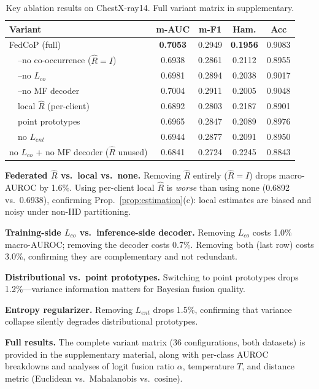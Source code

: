 \documentclass[10pt,twocolumn,letterpaper]{article}
\theoremstyle{definition}
\newcommand{\Rhat}{\widehat{R}}
\begin{document}
\begin{table}[t]
\centering
\caption{Key ablation results on ChestX-ray14. Full variant matrix in supplementary.}
\label{tab:ablation}
\footnotesize
\setlength{\tabcolsep}{3pt}
\begin{tabular}{lcccc}
\toprule
Variant & m-AUC & m-F1 & Ham. & Acc \\
\midrule
FedCoP (full)                  & \textbf{0.7053} & 0.2949 & \textbf{0.1956} & 0.9083 \\
~~--no co-occurrence ($\Rhat{=}I$) & 0.6938 & 0.2861 & 0.2112 & 0.8955 \\
~~--no $L_{co}$                 & 0.6981 & 0.2894 & 0.2038 & 0.9017 \\
~~--no MF decoder              & 0.7004 & 0.2911 & 0.2005 & 0.9048 \\
~~local $\Rhat$ (per-client)   & 0.6892 & 0.2803 & 0.2187 & 0.8901 \\
~~point prototypes             & 0.6965 & 0.2847 & 0.2089 & 0.8976 \\
~~no $L_{ent}$                 & 0.6944 & 0.2877 & 0.2091 & 0.8950 \\
\midrule
no $L_{co}$ + no MF decoder ($\Rhat$ unused) & 0.6841 & 0.2724 & 0.2245 & 0.8843 \\
\bottomrule
\end{tabular}
\end{table}

\noindent\textbf{Federated $\Rhat$ vs.\ local vs.\ none.} Removing $\Rhat$ entirely ($\Rhat{=}I$) drops macro-AUROC by 1.6\%. Using per-client local $\Rhat$ is \emph{worse} than using none (0.6892 vs.\ 0.6938), confirming Prop.~\ref{prop:estimation}(c): local estimates are biased and noisy under non-IID partitioning.

\noindent\textbf{Training-side $L_{co}$ vs.\ inference-side decoder.} Removing $L_{co}$ costs 1.0\% macro-AUROC; removing the decoder costs 0.7\%. Removing both (last row) costs 3.0\%, confirming they are complementary and not redundant.

\noindent\textbf{Distributional vs.\ point prototypes.} Switching to point prototypes drops 1.2\%---variance information matters for Bayesian fusion quality.

\noindent\textbf{Entropy regularizer.} Removing $L_{ent}$ drops 1.5\%, confirming that variance collapse silently degrades distributional prototypes.

\noindent\textbf{Full results.} The complete variant matrix (36 configurations, both datasets) is provided in the supplementary material, along with per-class AUROC breakdowns and analyses of logit fusion ratio $\alpha$, temperature $T$, and distance metric (Euclidean vs.\ Mahalanobis vs.\ cosine).
\end{document}
